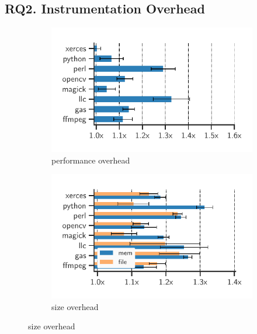 \subsection*{RQ2. Instrumentation Overhead}



\begin{figure}[t!]
	\centering
	\small
	\begin{subfigure}[t]{0.29\textwidth}
		\includegraphics[clip, trim=0.48cm 0.4cm 1.4cm 0.65cm, width=\textwidth]{fig/perf-overhead}
		\caption{performance overhead}
		\label{fig:performance-overhead}
	\end{subfigure}
	\hspace{10pt}
	\begin{subfigure}[t]{0.29\textwidth}
		\includegraphics[clip, trim=0.47cm 0.42cm 1.65cm 0.65cm, width=\textwidth]{fig/any-overhead}
		\caption{size overhead}
		\label{fig:size-overhead}
	\end{subfigure}

\end{figure}
